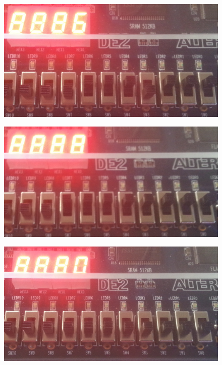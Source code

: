 \begin{enumerate}
	\begin{figure}[h]
		\centering
		\includegraphics[scale=0.2]{pictures/Oevelse5/opg5/1count_6.JPG}
		\caption{}
		\label{fig:1count6}
	\end{figure}
	\begin{figure}[h]
		\centering
		\includegraphics[scale=0.2]{pictures/Oevelse5/opg5/1count_8.JPG}
		\caption{}
		\label{fig:1count8}
	\end{figure}
	\begin{figure}[h]
		\centering
		\includegraphics[scale=0.2]{pictures/Oevelse5/opg5/1count_0.JPG}
		\caption{}
		\label{fig:1count0}
	\end{figure}
\end{enumerate}